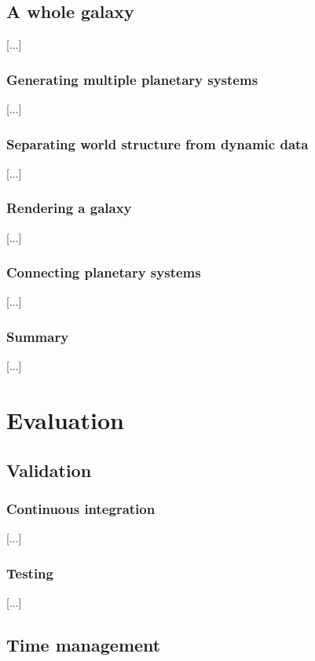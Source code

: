 \documentclass[a4paper,11pt,titlepage,abstract,numbers=noenddot,automark,mnsy,intlimits,rgb,dvipsnames]{report}
\begin{document}
\chapter{A whole galaxy}
[...]
\section{Generating multiple planetary systems}
[...]
\section{Separating world structure from dynamic data}
[...]
\section{Rendering a galaxy}
[...]
\section{Connecting planetary systems}
[...]
\section{Summary}
[...]
\part{Evaluation}
\chapter{Validation}
\label{validation}
\section{Continuous integration}
[...]
\section{Testing}
[...]
\chapter{Time management}
\end{document}
